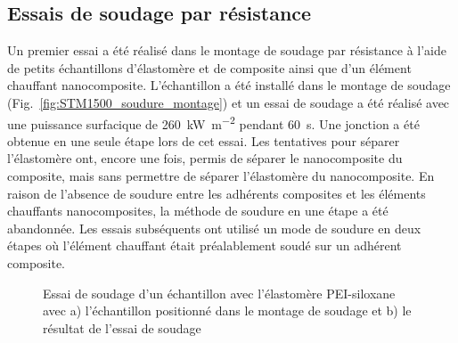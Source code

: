 \FloatBarrier

\subsection{Essais de soudage par résistance}

Un premier essai a été réalisé dans le montage de soudage par résistance à l'aide de petits échantillons d'élastomère et de composite ainsi que d'un élément chauffant nanocomposite. 
L'échantillon a été installé dans le montage de soudage (Fig.~\ref{fig:STM1500_soudure_montage}) et un essai de soudage a été réalisé avec une puissance surfacique de \SI[locale=FR]{260}{\kilo\watt\per\square\metre} pendant \SI[locale=FR]{60}{\second}. 
Une jonction a été obtenue en une seule étape lors de cet essai. 
Les tentatives pour séparer l'élastomère ont, encore une fois, permis de séparer le nanocomposite du composite, mais sans permettre de séparer l'élastomère du nanocomposite. 
En raison de l'absence de soudure entre les adhérents composites et les éléments chauffants nanocomposites, la méthode de soudure en une étape a été abandonnée.
Les essais subséquents ont utilisé un mode de soudure en deux étapes où l'élément chauffant était préalablement soudé sur un adhérent composite. 

\FloatBarrier
\begin{figure}[h]
	\centering
	 \qquad
	\caption{Essai de soudage d'un échantillon avec l'élastomère PEI-siloxane avec a) l'échantillon positionné dans le montage de soudage et b) le résultat de l'essai de soudage}
	\label{fig:STM1500_soudure}
\end{figure}
\FloatBarrier

